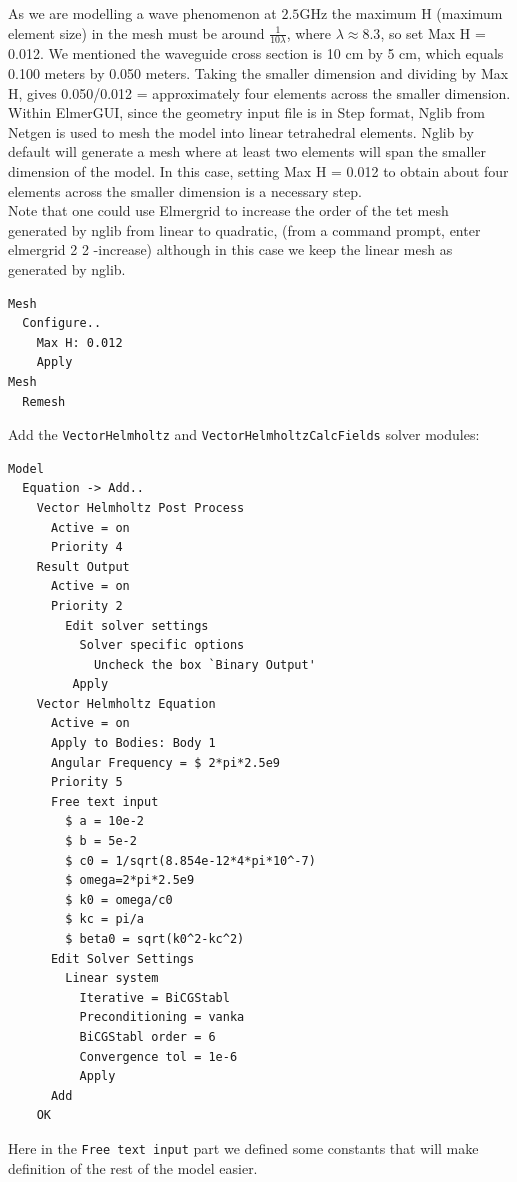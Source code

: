 As we are modelling a wave phenomenon at $2.5 \mathrm{GHz}$ the maximum H (maximum element size) in the mesh must be around $\frac 1 {10\lambda}$, where $\lambda\approx8.3$, so set Max H = 0.012.  We mentioned the waveguide cross section is 10 cm by 5 cm, which equals 0.100 meters by 0.050 meters.  Taking the smaller dimension and dividing by Max H, gives 0.050/0.012 = approximately four elements across the smaller dimension.\\

Within ElmerGUI, since the geometry input file is in Step format, Nglib from Netgen is used to mesh the model into linear tetrahedral elements.  Nglib by default will generate a mesh where at least two elements will span the smaller dimension of the model.  In this case, setting Max H = 0.012 to obtain about four elements across the smaller dimension is a necessary step.\\

Note that one could use Elmergrid to increase the order of the tet mesh generated by nglib from linear to quadratic, (from a command prompt, enter elmergrid 2 2 -increase) although in this case we keep the linear mesh as generated by nglib.

\begin{verbatim}
Mesh
  Configure..
    Max H: 0.012
    Apply
Mesh
  Remesh
\end{verbatim}

Add the \texttt{VectorHelmholtz} and \texttt{VectorHelmholtzCalcFields} solver modules:
\begin{verbatim}
Model
  Equation -> Add..
    Vector Helmholtz Post Process
      Active = on
      Priority 4
    Result Output
      Active = on
      Priority 2
        Edit solver settings
          Solver specific options
            Uncheck the box `Binary Output'
         Apply
    Vector Helmholtz Equation
      Active = on
      Apply to Bodies: Body 1
      Angular Frequency = $ 2*pi*2.5e9
      Priority 5
      Free text input
        $ a = 10e-2
        $ b = 5e-2
        $ c0 = 1/sqrt(8.854e-12*4*pi*10^-7)
        $ omega=2*pi*2.5e9
        $ k0 = omega/c0
        $ kc = pi/a
        $ beta0 = sqrt(k0^2-kc^2)
      Edit Solver Settings
        Linear system
          Iterative = BiCGStabl
          Preconditioning = vanka
          BiCGStabl order = 6
          Convergence tol = 1e-6
          Apply
      Add
    OK
\end{verbatim}

Here in the \texttt{Free text input} part we defined some constants that will make definition of the rest of the model easier.\\ 

